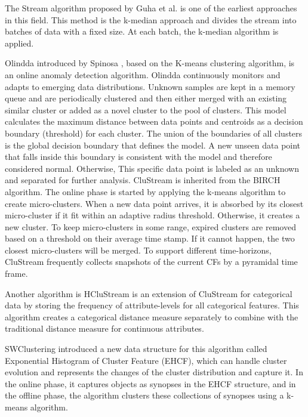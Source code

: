 \documentclass[../UNBThesis2.tex]{subfiles}
\begin{document}
\begin{itemize}
The Stream algorithm proposed by Guha et al. \cite{o2002streaming} is one of the earliest approaches in this field. This method is the k-median approach and divides the stream into batches of data with a fixed size. At each batch, the k-median algorithm is applied. 


Olindda introduced by Spinosa \cite{spinosa2007olindda}, based on the K-means clustering algorithm, is an online anomaly detection algorithm. Olindda continuously monitors and adapts to emerging data distributions. Unknown samples are kept in a memory queue and are periodically clustered and then either merged with an existing similar cluster or added as a novel cluster to the pool of clusters.
This model calculates the maximum distance between data points and centroids as a decision boundary (threshold) for each cluster. The union of the boundaries of all clusters is the global decision boundary that defines the model. A new unseen data point that falls inside this boundary is consistent with the model and therefore considered normal. Otherwise, This specific data point is labeled as an unknown and separated for further analysis.
CluStream \cite{aggarwal2003framework} is inherited from the BIRCH algorithm. The online phase is started by applying the k-means algorithm to create micro-clusters. When a new data point arrives, it is absorbed by its closest micro-cluster if it fit within an adaptive radius threshold. Otherwise, it creates a new cluster. To keep micro-clusters in some range, expired clusters are removed based on a threshold on their average time stamp. If it cannot happen, the two closest micro-clusters will be merged.
To support different time-horizons, CluStream frequently collects snapshots of the current CFs by a pyramidal time frame. 

Another algorithm is HCluStream \cite{yang2006hclustream} is an extension of CluStream for categorical data by storing the frequency of attribute-levels for all categorical features. This algorithm creates a  categorical distance measure separately to combine with the traditional distance measure for continuous attributes.

SWClustering \cite{zhou2008tracking} introduced a new data structure for this algorithm called Exponential Histogram of Cluster Feature (EHCF), which can handle cluster evolution and represents the changes of the cluster distribution and capture it. In the online phase, it captures objects as synopses in the EHCF structure, and in the offline phase, the algorithm clusters these collections of synopses using a k-means algorithm.


\end{itemize}
\end{document}
